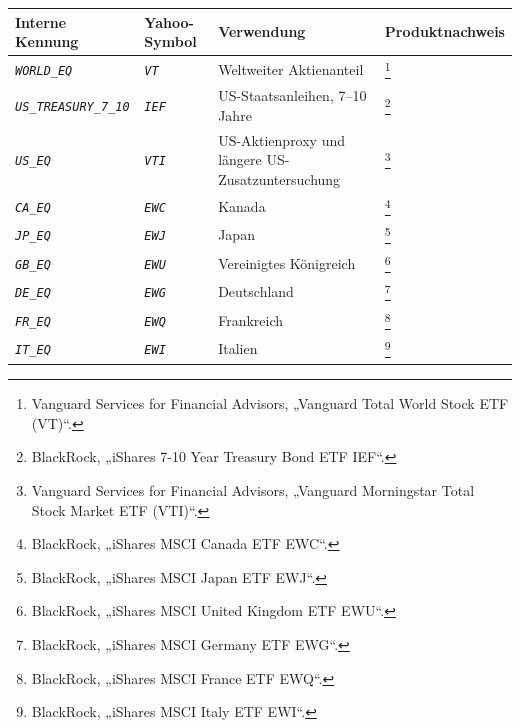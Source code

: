 \documentclass[
  ngerman,
  a4paper,
  DIV=11,
  oneside]{scrreprt}
\newcounter{none} %
\begin{document}
{\def\LTcaptype{none} %
\begin{longtable}[]{@{}
  >{\raggedright\arraybackslash}p{}
  >{\raggedright\arraybackslash}p{}
  >{\raggedright\arraybackslash}p{}
  >{\raggedright\arraybackslash}p{}@{}}
\toprule\noalign{}
\begin{minipage}[b]{\linewidth}\raggedright
Interne Kennung
\end{minipage} & \begin{minipage}[b]{\linewidth}\raggedright
Yahoo-Symbol
\end{minipage} & \begin{minipage}[b]{\linewidth}\raggedright
Verwendung
\end{minipage} & \begin{minipage}[b]{\linewidth}\raggedright
Produktnachweis
\end{minipage} \\
\midrule\noalign{}
\endhead
\bottomrule\noalign{}
\endlastfoot
\emph{\texttt{WORLD\_EQ}} & \emph{\texttt{VT}} & Weltweiter Aktienanteil
& \footnote{Vanguard Services for Financial Advisors, {„Vanguard {Total
  World Stock ETF} ({VT})``}.} \\
\emph{\texttt{US\_TREASURY\_7\_10}} & \emph{\texttt{IEF}} &
US-Staatsanleihen, 7--10 Jahre & \footnote{BlackRock, {„{iShares} 7-10
  {Year Treasury Bond ETF} \textbar{} {IEF}``}.} \\
\emph{\texttt{US\_EQ}} & \emph{\texttt{VTI}} & US-Aktienproxy und
längere US-Zusatzuntersuchung & \footnote{Vanguard Services for
  Financial Advisors, {„Vanguard {Morningstar Total Stock Market ETF}
  ({VTI})``}.} \\
\emph{\texttt{CA\_EQ}} & \emph{\texttt{EWC}} & Kanada & \footnote{BlackRock,
  {„{iShares MSCI Canada ETF} \textbar{} {EWC}``}.} \\
\emph{\texttt{JP\_EQ}} & \emph{\texttt{EWJ}} & Japan & \footnote{BlackRock,
  {„{iShares MSCI Japan ETF} \textbar{} {EWJ}``}.} \\
\emph{\texttt{GB\_EQ}} & \emph{\texttt{EWU}} & Vereinigtes Königreich &
\footnote{BlackRock, {„{iShares MSCI United Kingdom ETF} \textbar{}
  {EWU}``}.} \\
\emph{\texttt{DE\_EQ}} & \emph{\texttt{EWG}} & Deutschland &
\footnote{BlackRock, {„{iShares MSCI Germany ETF} \textbar{} {EWG}``}.} \\
\emph{\texttt{FR\_EQ}} & \emph{\texttt{EWQ}} & Frankreich &
\footnote{BlackRock, {„{iShares MSCI France ETF} \textbar{} {EWQ}``}.} \\
\emph{\texttt{IT\_EQ}} & \emph{\texttt{EWI}} & Italien & \footnote{BlackRock,
  {„{iShares MSCI Italy ETF} \textbar{} {EWI}``}.} \\
\end{longtable}
}
\end{document}
